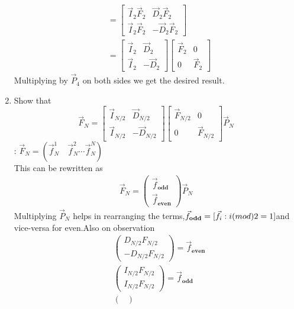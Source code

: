 \documentclass[journal,12pt,twocolumn]{IEEEtran}
\renewcommand\thesection{\arabic{section}}
\begin{document}
\begin{enumerate}[label=\arabic*.,ref=\thesection.\theenumi]
\begin{align}
&=\begin{bmatrix}
\vec{I}_{2} \vec{F}_{2} &\vec{D}_{2} \vec{F}_{2}\\
\vec{I}_{2} \vec{F}_{2} & -\vec{D}_{2} \vec{F}_{2}
\end{bmatrix}
\\
&= \begin{bmatrix}
	\vec{I}_{2} & \vec{D}_{2} \\
\vec{I}_{2} & -\vec{D}_{2}
\end{bmatrix}
\begin{bmatrix}
\vec{F}_{2} & 0 \\
0 & \vec{F}_{2}
\end{bmatrix}
\end{align}
Multiplying by $\vec{P}_4$ on both sides we get the desired result.
\item Show that 
\begin{equation}
\vec{F}_{N}=
\begin{bmatrix}
\vec{I}_{N/2} & \vec{D}_{N/2} \\
\vec{I}_{N/2} & -\vec{D}_{N/2}
\end{bmatrix}
\begin{bmatrix}
\vec{F}_{N/2} & 0 \\
0 & \vec{F}_{N/2}
\end{bmatrix}
\vec{P}_{N}
\end{equation}
\solution:
$\vec{F}_N=(\vec{f}_{N}^1 \quad \vec{f}_{N}^2 \cdots \vec{f}_{N}^N)$\\
This can be rewritten as 
\begin{align}
\vec{F}_N=\begin{pmatrix}
\vec{f}_{\textbf{odd}}\\
\vec{f}_{\textbf{even}}
\end{pmatrix}
\vec{P}_{N}
\end{align}
Multiplying $\vec{P}_{N}$ helps in rearranging the terms,$\vec{f}_{\textbf{odd}}=[\vec{f}_{i}:i\text(mod)2=1]$and vice-versa for even.Also on observation
\begin{align}
&\begin{pmatrix}
D_{N/2} F_{N/2}\\
-D_{N/2} F_{N/2}
\end{pmatrix}=\vec{f}_{\textbf{even}}\\
&\begin{pmatrix}
I_{N/2} F_{N/2}\\
I_{N/2} F_{N/2}
\end{pmatrix}=\vec{f}_{\textbf{odd}}\\
& \begin{pmatrix}

\end{pmatrix}
\end{align}
\end{enumerate}
\end{document}
